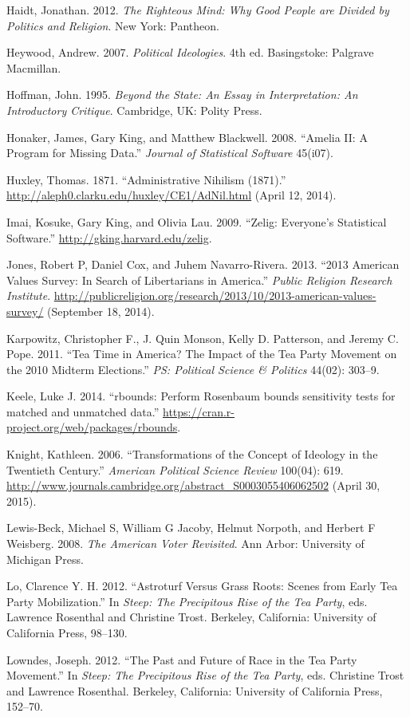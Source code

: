 \documentclass[12pt,]{article}
\begin{document}
Haidt, Jonathan. 2012. \emph{The Righteous Mind: Why Good People are
Divided by Politics and Religion}. New York: Pantheon.

Heywood, Andrew. 2007. \emph{Political Ideologies}. 4th ed. Basingstoke:
Palgrave Macmillan.

Hoffman, John. 1995. \emph{Beyond the State: An Essay in Interpretation:
An Introductory Critique}. Cambridge, UK: Polity Press.

Honaker, James, Gary King, and Matthew Blackwell. 2008. ``Amelia II: A
Program for Missing Data.'' \emph{Journal of Statistical Software}
45(i07).

Huxley, Thomas. 1871. ``Administrative Nihilism (1871).''
\url{http://aleph0.clarku.edu/huxley/CE1/AdNil.html} (April 12, 2014).

Imai, Kosuke, Gary King, and Olivia Lau. 2009. ``Zelig: Everyone's
Statistical Software.'' \url{http://gking.harvard.edu/zelig}.

Jones, Robert P, Daniel Cox, and Juhem Navarro-Rivera. 2013. ``2013
American Values Survey: In Search of Libertarians in America.''
\emph{Public Religion Research Institute}.
\url{http://publicreligion.org/research/2013/10/2013-american-values-survey/}
(September 18, 2014).

Karpowitz, Christopher F., J. Quin Monson, Kelly D. Patterson, and
Jeremy C. Pope. 2011. ``Tea Time in America? The Impact of the Tea Party
Movement on the 2010 Midterm Elections.'' \emph{PS: Political Science \&
Politics} 44(02): 303--9.

Keele, Luke J. 2014. ``rbounds: Perform Rosenbaum bounds sensitivity
tests for matched and unmatched data.''
\url{https://cran.r-project.org/web/packages/rbounds}.

Knight, Kathleen. 2006. ``Transformations of the Concept of Ideology in
the Twentieth Century.'' \emph{American Political Science Review}
100(04): 619.
\url{http://www.journals.cambridge.org/abstract_S0003055406062502}
(April 30, 2015).

Lewis-Beck, Michael S, William G Jacoby, Helmut Norpoth, and Herbert F
Weisberg. 2008. \emph{The American Voter Revisited}. Ann Arbor:
University of Michigan Press.

Lo, Clarence Y. H. 2012. ``Astroturf Versus Grass Roots: Scenes from
Early Tea Party Mobilization.'' In \emph{Steep: The Precipitous Rise of
the Tea Party}, eds. Lawrence Rosenthal and Christine Trost. Berkeley,
California: University of California Press, 98--130.

Lowndes, Joseph. 2012. ``The Past and Future of Race in the Tea Party
Movement.'' In \emph{Steep: The Precipitous Rise of the Tea Party}, eds.
Christine Trost and Lawrence Rosenthal. Berkeley, California: University
of California Press, 152--70.
\end{document}
